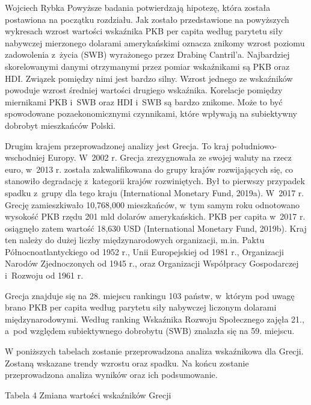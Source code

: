 \begin{artplenv}{Wojciech Rybka}
Powyższe badania potwierdzają hipotezę, która została postawiona na początku rozdziału. Jak zostało przedstawione na
powyższych wykresach wzrost wartości wskaźnika PKB per capita według parytetu siły nabywczej mierzonego dolarami
amerykańskimi oznacza znikomy wzrost poziomu zadowolenia z~życia (SWB) wyrażonego przez Drabinę Cantril’a. Najbardziej
skorelowanymi danymi otrzymanymi przez pomiar wskaźnikami są PKB oraz HDI. Związek pomiędzy nimi jest bardzo silny.
Wzrost jednego ze wskaźników powoduje wzrost średniej wartości drugiego wskaźnika. Korelacje pomiędzy miernikami
PKB i~SWB oraz HDI i~SWB są bardzo znikome. Może to być spowodowane pozaekonomicznymi czynnikami, które wpływają na
subiektywny dobrobyt mieszkańców Polski.

Drugim krajem przeprowadzonej analizy jest Grecja. To kraj południowo-wschodniej Europy. W~2002 r. Grecja
zrezygnowała ze swojej waluty na rzecz euro, w~2013 r. została zakwalifikowana do grupy krajów rozwijających się, co
stanowiło degradację z~kategorii krajów rozwiniętych. Był to pierwszy przypadek spadku z~grupy dla tego kraju
\label{ref:RNDOaa1RXQDzx}(International Monetary Fund, 2019a). W~2017 r. Grecję zamieszkiwało 10,768,000 mieszkańców,
w~tym samym roku odnotowano wysokość PKB rzędu 201 mld dolarów amerykańskich. PKB per capita w~2017 r. osiągnęło zatem
wartość 18,630 USD \label{ref:RNDRQRmi2Olaq}(International Monetary Fund, 2019b). Kraj ten należy do dużej liczby
międzynarodowych organizacji, m.in. Paktu Północnoatlantyckiego od 1952 r., Unii Europejskiej od 1981 r., Organizacji
Narodów Zjednoczonych od 1945 r., oraz Organizacji Współpracy Gospodarczej i~Rozwoju od 1961 r. 

Grecja znajduje się na 28. miejscu rankingu 103 państw, w~którym pod uwagę brano PKB per capita według parytetu siły
nabywczej liczonym dolarami międzynarodowymi. Według ranking Wskaźnika Rozwoju Społecznego zajęła 21., a~pod względem
subiektywnego dobrobytu (SWB) znalazła się na 59. miejscu.

W poniższych tabelach zostanie przeprowadzona analiza wskaźnikowa dla Grecji. Zostaną wskazane trendy wzrostu oraz
spadku. Na końcu zostanie przeprowadzona analiza wyników oraz ich podsumowanie. 

{\centering
Tabela 4 Zmiana wartości wskaźników Grecji
\par}


\end{artplenv}
